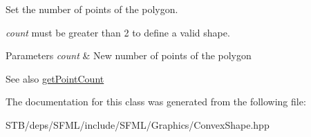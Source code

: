 Set the number of points of the polygon. 

{\itshape count} must be greater than 2 to define a valid shape.


\begin{DoxyParams}{Parameters}
{\em count} & New number of points of the polygon\\
\hline
\end{DoxyParams}
\begin{DoxySeeAlso}{See also}
\hyperlink{classsf_1_1_convex_shape_af81b86134fe54f2d50d9fab0db065ef1}{get\+Point\+Count} 
\end{DoxySeeAlso}


The documentation for this class was generated from the following file\+:\begin{DoxyCompactItemize}
\item 
S\+T\+B/deps/\+S\+F\+M\+L/include/\+S\+F\+M\+L/\+Graphics/Convex\+Shape.\+hpp\end{DoxyCompactItemize}
